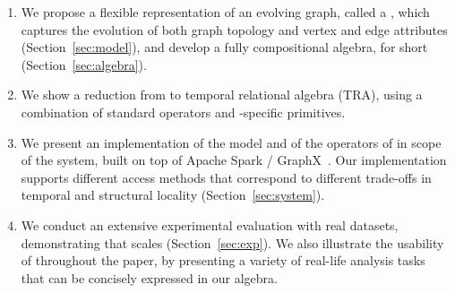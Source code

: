 \begin{enumerate}[noitemsep,leftmargin=*]

\item We propose a flexible representation of an evolving graph,
  called a \tg, which captures the evolution of both graph topology
  and vertex and edge attributes (Section~\ref{sec:model}), and
  develop a fully compositional \tg algebra, \tga for short
  (Section~\ref{sec:algebra}).

\item We show a reduction from \tga to temporal relational algebra
  (TRA), using a combination of standard operators and \tg-specific
  primitives. 

\item We present an implementation of the \tg model and of the
  operators of \tga in scope of the \ql system, built on top of Apache
  Spark / GraphX~\cite{DBLP:conf/osdi/GonzalezXDCFS14}.  Our
  implementation supports different access methods that correspond to
  different trade-offs in temporal and structural locality
  (Section~\ref{sec:system}).  

\item We conduct an extensive experimental evaluation with real
  datasets, demonstrating that \ql scales (Section~\ref{sec:exp}).  We
  also illustrate the usability of \tga throughout the paper, by
  presenting a variety of real-life analysis tasks that can be
  concisely expressed in our algebra.

\end{enumerate}


